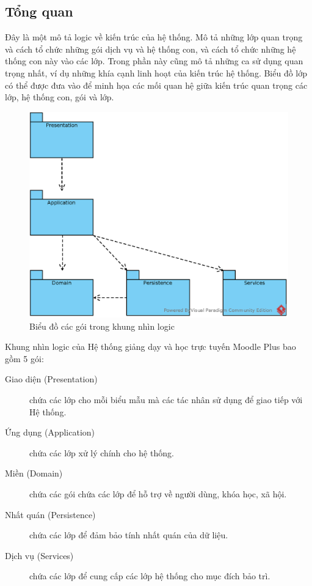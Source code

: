 \documentclass[./../main_file.tex]{subfiles}
\begin{document}
	\subsection{Tổng quan}
	Đây là một mô tả logic về kiến trúc của hệ thống. Mô tả những lớp quan trọng và cách tổ chức những gói dịch vụ và hệ thống con, và cách tổ chức những hệ thống con này vào các lớp. Trong phần này cũng mô tả những ca sử dụng quan trọng nhất, ví dụ những khía cạnh linh hoạt của kiến trúc hệ thống. Biểu đồ lớp có thể được đưa vào để minh họa các mối quan hệ giữa kiến trúc quan trọng các lớp, hệ thống con, gói và lớp.
	\begin{figure}[H]
		\centering
		\includegraphics[width=\linewidth]{./images/logic_view_package_diagram.eps}
		\caption{Biểu đồ các gói trong khung nhìn logic}
	\end{figure}
	Khung nhìn logic của Hệ thống giảng dạy và học trực tuyến Moodle Plus bao gồm 5 gói:
	\begin{description}
		\item[Giao diện (Presentation)] chứa các lớp cho mỗi biểu mẫu mà các tác nhân sử dụng để giao tiếp với Hệ thống.
		\item[Ứng dụng (Application)] chứa các lớp xử lý chính cho hệ thống.
		\item[Miền (Domain)] chứa các gói chứa các lớp để hỗ trợ về người dùng, khóa học, xã hội.
		\item[Nhất quán (Persistence)] chứa các lớp để đảm bảo tính nhất quán của dữ liệu.
		\item[Dịch vụ (Services)] chứa các lớp để cung cấp các lớp hệ thống cho mục đích bảo trì.
	\end{description}
\end{document}
